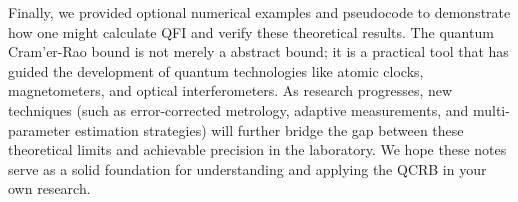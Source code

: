 Finally, we provided optional numerical examples and pseudocode to
demonstrate how one might calculate QFI and verify these theoretical
results. The quantum Cram'er-Rao bound is not merely a abstract bound;
it is a practical tool that has guided the development of quantum
technologies like atomic clocks, magnetometers, and optical
interferometers. As research progresses, new techniques (such as
error-corrected metrology, adaptive measurements, and multi-parameter
estimation strategies) will further bridge the gap between these
theoretical limits and achievable precision in the laboratory. We hope
these notes serve as a solid foundation for understanding and applying
the QCRB in your own research.



